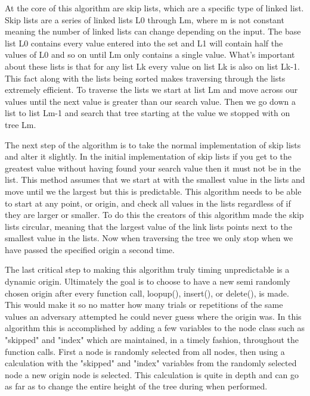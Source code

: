 \documentclass[11pt]{article}
\begin{document}
 At the core of this algorithm are skip lists, which are a specific type of linked list. 
Skip lists are a series of linked lists L0 through Lm, where m is not constant meaning
the number of linked lists can change depending on the input. The base list L0 contains
every value entered into the set and L1 will contain half the values of L0 and so on until 
Lm only contains a single value. What's important about these lists is that for any
list Lk every value on list Lk is also on list Lk-1. This fact along with the lists
being sorted makes traversing through the lists extremely efficient. To traverse the 
lists we start at list Lm and move across our values until the next value is greater 
than our search value. Then we go down a list to list Lm-1 and search that tree starting 
at the value we stopped with on tree Lm. 

	The next step of the algorithm is to take the normal implementation of skip 
lists and alter it slightly. In the initial implementation of skip lists if you
get to the greatest value without having found your search value then it must not 
be in the list. This method assumes that we start at with the smallest value in 
the lists and move until we the largest but this is predictable. This algorithm 
needs to be able to start at any point, or origin, and check all values in the 
lists regardless of if they are larger or smaller. To do this the creators of this 
algorithm made the skip lists circular, meaning that the largest value of the link 
lists points next to the smallest value in the lists. Now when traversing the tree 
we only stop when we have passed the specified origin a second time.
  
	The last critical step to making this algorithm truly timing unpredictable is a 
dynamic origin. Ultimately the goal is to choose to have a new semi randomly chosen 
origin after every function call, loopup(), insert(), or delete(), is made. This would 
make it so no matter how many trials or repetitions of the same values an adversary 
attempted he could never guess where the origin was. In this algorithm this is accomplished 
by adding a few variables to the node class such as "skipped" and "index" which are maintained, 
in a timely fashion, throughout the function calls. First a node is randomly selected from 
all nodes, then using a calculation with the "skipped" and "index" variables from the 
randomly selected node a new origin node is selected. This calculation is quite in depth 
and can go as far as to change the entire height of the tree during when performed. 
\end{document}
